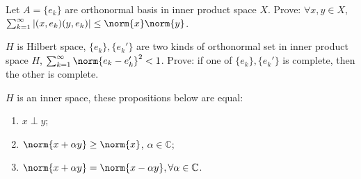 \documentclass{ctexart}
\newif\ifpreface
\begin{document}
\large
\setlength{\baselineskip}{1.2em}
\ifpreface

\else
\maketitle
\fi
{}
\begin{problem}
Let $A=\{e_k\}$ are orthonormal basis in inner product space $X$. Prove: $\forall x,y\in X$, $\sum_{k=1}^{\infty}|(x,e_k)(y,e_k)|\leq \norm{x}\norm{y}$.
\end{problem}

\begin{problem}
$H$ is Hilbert space, $\{e_k\},\{e_k'\}$ are two kinds of orthonormal set in inner product space $H$, $\sum_{k=1}^{\infty}\norm{e_k-e_k'}^2<1$. Prove: if one of $\{e_k\},\{e_k'\}$ is complete, then the other is complete.
\end{problem}

\begin{problem}
$H$ is an inner space, these propositions below are equal:
\begin{enumerate}
\item $x\perp y$;
\item $\norm{x+\alpha y}\geq \norm{x}$, $\alpha\in \mathbb{C}$;
\item $\norm{x+\alpha y}=\norm{x-\alpha y},\forall \alpha\in \mathbb{C}$.
\end{enumerate}
\end{problem}

\iffalse
\begin{problem}
$X$ is a linear space over field $\mathbb{C}$ or $\mathbb{R}$, $(X,\norm{\cdot})$ is a $B^*$ space, then $\norm{\cdot}$ can be induced by an inner product if and only if $\forall x,y\in X$, $\norm{x+y}^2+\norm{x-y}^2=2(\norm{x}^2+\norm{y}^2)$.
\end{problem}
\begin{lemma}\label{lem:1}
$f:\mathbb{R}\to \mathbb{R}$ s.t. $f$ is continous and $f(m+n)=f(m)+f(n),\forall m,n\in \mathbb{R}$, then $f(x)=xf(1),\forall x\in \mathbb{R}$.
\end{lemma}


\fi
\end{document}
